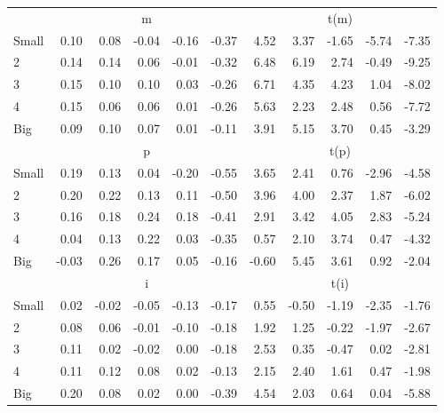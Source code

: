 \begin{table}[!ht]
\begin{tabular}{lrrrrrrrrrr}
      & \multicolumn{5}{c}{m} & \multicolumn{5}{c}{t(m)}
    
    \\
      \cmidrule(r){2-6} \cmidrule(r){7-11}

    Small   & 0.10  & 0.08  & -0.04  & -0.16  & -0.37  & 4.52  & 3.37  & -1.65  & -5.74  & -7.35  \\
         2  & 0.14  & 0.14  & 0.06  & -0.01  & -0.32  & 6.48  & 6.19  & 2.74  & -0.49  & -9.25  \\
         3  & 0.15  & 0.10  & 0.10  & 0.03  & -0.26  & 6.71  & 4.35  & 4.23  & 1.04  & -8.02  \\
         4  & 0.15  & 0.06  & 0.06  & 0.01  & -0.26  & 5.63  & 2.23  & 2.48  & 0.56  & -7.72  \\
    Big     & 0.09  & 0.10  & 0.07  & 0.01  & -0.11  & 3.91  & 5.15  & 3.70  & 0.45  & -3.29  \\

  
    
      & \multicolumn{5}{c}{p} & \multicolumn{5}{c}{t(p)}
    
    \\
      \cmidrule(r){2-6} \cmidrule(r){7-11}

    Small   & 0.19  & 0.13  & 0.04  & -0.20  & -0.55  & 3.65  & 2.41  & 0.76  & -2.96  & -4.58  \\
         2  & 0.20  & 0.22  & 0.13  & 0.11  & -0.50  & 3.96  & 4.00  & 2.37  & 1.87  & -6.02  \\
         3  & 0.16  & 0.18  & 0.24  & 0.18  & -0.41  & 2.91  & 3.42  & 4.05  & 2.83  & -5.24  \\
         4  & 0.04  & 0.13  & 0.22  & 0.03  & -0.35  & 0.57  & 2.10  & 3.74  & 0.47  & -4.32  \\
    Big     & -0.03  & 0.26  & 0.17  & 0.05  & -0.16  & -0.60  & 5.45  & 3.61  & 0.92  & -2.04  \\

  
    
      & \multicolumn{5}{c}{i} & \multicolumn{5}{c}{t(i)}
    
    \\
      \cmidrule(r){2-6} \cmidrule(r){7-11}

    Small   & 0.02  & -0.02  & -0.05  & -0.13  & -0.17  & 0.55  & -0.50  & -1.19  & -2.35  & -1.76  \\
         2  & 0.08  & 0.06  & -0.01  & -0.10  & -0.18  & 1.92  & 1.25  & -0.22  & -1.97  & -2.67  \\
         3  & 0.11  & 0.02  & -0.02  & 0.00  & -0.18  & 2.53  & 0.35  & -0.47  & 0.02  & -2.81  \\
         4  & 0.11  & 0.12  & 0.08  & 0.02  & -0.13  & 2.15  & 2.40  & 1.61  & 0.47  & -1.98  \\
    Big     & 0.20  & 0.08  & 0.02  & 0.00  & -0.39  & 4.54  & 2.03  & 0.64  & 0.04  & -5.88  \\

  

  \bottomrule
\end{tabular}
\label{tbl:25_Size_Var_B16b}
\end{table}